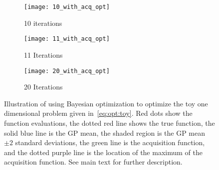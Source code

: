 \begin{figure}[t]
	\centering
		\begin{subfigure}[b]{0.32\textwidth}
			\texttt{[image: 10\_with\_acq\_opt]}
			\caption{10 iterations \label{fig:opt:bayes-opt:10}}
		\end{subfigure}
			\begin{subfigure}[b]{0.32\textwidth}
			\texttt{[image: 11\_with\_acq\_opt]}
			\caption{11 Iterations \label{fig:opt:bayes-opt:11}}
		\end{subfigure}
			\begin{subfigure}[b]{0.32\textwidth}
			\texttt{[image: 20\_with\_acq\_opt]}
			\caption{20 Iterations \label{fig:opt:bayes-opt:20}}
		\end{subfigure}
	\caption{Illustration of using Bayesian optimization to optimize the
		toy one dimensional problem given in~\eqref{eq:opt:toy}.  Red dots show
		the function evaluations,  the dotted red line shows the true function, 
		the solid blue line is the GP mean, the shaded region is the GP mean $\pm 2$
		standard deviations, the green line is the acquisition function, and
		the dotted purple line is the location of the maximum of the acquisition
		function. See main text for further description.\label{fig:opt:bayes-opt}}
\end{figure}

